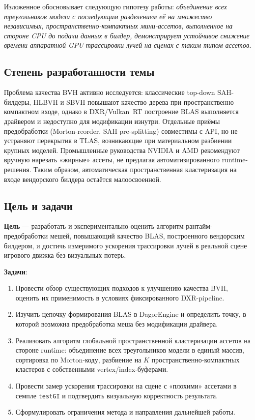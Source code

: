 Изложенное обосновывает следующую гипотезу работы: \emph{объединение всех треугольников модели с последующим разделением её на множество независимых, пространственно-компактных мини-ассетов, выполненное на стороне CPU до подачи данных в билдер, демонстрирует устойчивое снижение времени аппаратной GPU-трассировки лучей на сценах с таким типом ассетов.}

\subsection{Степень разработанности темы}

Проблема качества BVH активно исследуется: классические top-down SAH-билдеры,
HLBVH и SBVH повышают качество дерева при пространственно компактном входе,
однако в DXR/Vulkan~RT построение BLAS выполняется драйвером и недоступно
для модификации изнутри. Отдельные приёмы предобработки (Morton-reorder,
SAH pre-splitting) совместимы с API, но не устраняют перекрытия в TLAS,
возникающие при материальном разбиении крупных моделей. Промышленные
руководства NVIDIA и AMD рекомендуют вручную нарезать «жирные» ассеты,
не предлагая автоматизированного runtime-решения. Таким образом, автоматическая
пространственная кластеризация на входе вендорского билдера остаётся
малоосвоенной.

\subsection{Цель и задачи}

\textbf{Цель} --- разработать и экспериментально оценить алгоритм
рантайм-предобработки мешей, повышающий качество BLAS, построенного
вендорским билдером, и достичь измеримого ускорения трассировки
лучей в реальной сцене игрового движка без визуальных потерь.

\textbf{Задачи}:
\begin{enumerate}
    \item Провести обзор существующих подходов к улучшению качества
      BVH, оценить их применимость в
      условиях фиксированного DXR-pipeline.
    \item Изучить цепочку формирования BLAS в DagorEngine и
      определить точку, в которой возможна предобработка меша без
      модификации драйвера.
    \item Реализовать алгоритм глобальной пространственной кластеризации ассетов на
      стороне runtime: объединение всех треугольников модели в
      единый массив, сортировка по Morton-коду, разбиение на $K$
      пространственно-компактных кластеров с собственными
      vertex/index-буферами.
    \item Провести замер ускорения трассировки на сцене с
      «плохими» ассетами в семпле \texttt{testGI} и подтвердить
      визуальную корректность результата.
    \item Сформулировать ограничения метода и направления
      дальнейшей работы.
\end{enumerate}

